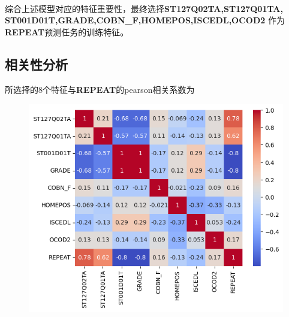 \documentclass[12pt, a4paper, oneside]{ctexart}
\begin{document}
\begin{figure}[h!]
    \\
    \label{wildlife}
\end{figure}

\clearpage
综合上述模型对应的特征重要性，最终选择\textbf{ST127Q02TA,ST127Q01TA,\\ST001D01T,GRADE,COBN\_F,HOMEPOS,ISCEDL,OCOD2}   作为\textbf{REPEAT}预测任务的训练特征。




\subsection{相关性分析}
所选择的8个特征与\textbf{REPEAT}的pearson相关系数为
\begin{figure}[htbp]
    \centering
	\includegraphics[width=1\textwidth]{./img/13.png}
\end{figure}
\end{document}
